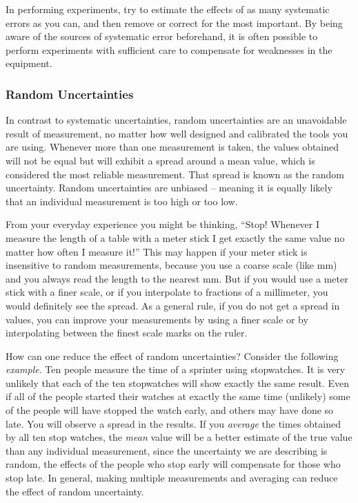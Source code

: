 In performing experiments, try to estimate the effects of as many systematic errors as you can, and then remove or correct for the most important. By being aware of the sources of systematic error beforehand, it is often possible to perform experiments with sufficient care to compensate for weaknesses in the equipment.

\subsubsection{Random Uncertainties}

In contrast to systematic uncertainties, random uncertainties are an unavoidable result of measurement, no matter how well designed and calibrated the tools you are using. Whenever more than one measurement is taken, the values obtained will not be equal but will exhibit a spread around a mean value, which is considered the most reliable measurement. That spread is known as the random uncertainty. Random uncertainties are unbiased -- meaning it is equally likely that an individual measurement is too high or too low. \myskip

From your everyday experience you might be thinking, ``Stop! Whenever I measure the length of a table with a meter stick I get exactly the same value no matter how often I measure it!''   This may happen if your meter stick is insensitive to random measurements, because you use a coarse scale (like $\mathrm{mm}$) and you always read the length to the nearest $\mathrm{mm}$. But if you would use a meter stick with a finer scale, or if you interpolate to fractions of a millimeter, you would definitely see the spread. As a general rule, if you do not get a spread in values, you can improve your measurements by using a finer scale or by interpolating between the finest scale marks on the ruler. \myskip

How can one reduce the effect of random uncertainties?  Consider the following \emph{example}. Ten people measure the time of a sprinter using stopwatches. It is very unlikely that each of the ten stopwatches will show exactly the same result. Even if all of the people started their watches at exactly the same time (unlikely) some of the people will have stopped the watch early, and others may have done so late. You will observe a spread in the results. If you \emph{average} the times obtained by all ten stop watches, the \emph{mean} value will be a better estimate of the true value than any individual measurement, since the uncertainty we are describing is random, the effects of the people who stop early will compensate for those who stop late. In general, making multiple measurements and averaging can reduce the effect of random uncertainty. \myskip

